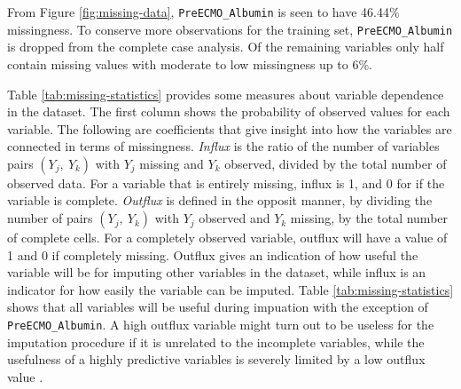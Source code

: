 \documentclass[12pt,]{article}
\begin{document}
From Figure \ref{fig:missing-data}, \texttt{PreECMO\_Albumin} is seen to
have 46.44\% missingness. To conserve more observations for the training
set, \texttt{PreECMO\_Albumin} is dropped from the complete case
analysis. Of the remaining variables only half contain missing values
with moderate to low missingness up to 6\%.

Table \ref{tab:missing-statistics} provides some measures about variable
dependence in the dataset. The first column shows the probability of
observed values for each variable. The following are coefficients that
give insight into how the variables are connected in terms of
missingness. \emph{Influx} is the ratio of the number of variables pairs
\((Y_j, ~Y_k)\) with \(Y_j\) missing and \(Y_k\) observed, divided by
the total number of observed data. For a variable that is entirely
missing, influx is 1, and 0 for if the variable is complete.
\emph{Outflux} is defined in the opposit manner, by dividing the number
of pairs \((Y_j, ~Y_k)\) with \(Y_j\) observed and \(Y_k\) missing, by
the total number of complete cells. For a completely observed variable,
outflux will have a value of 1 and 0 if completely missing. Outflux
gives an indication of how useful the variable will be for imputing
other variables in the dataset, while influx is an indicator for how
easily the variable can be imputed. Table \ref{tab:missing-statistics}
shows that all variables will be useful during impuation with the
exception of \texttt{PreECMO\_Albumin}. A high outflux variable might
turn out to be useless for the imputation procedure if it is unrelated
to the incomplete variables, while the usefulness of a highly predictive
variables is severely limited by a low outflux value
\autocite{van_buuren_flexible_2012}.
\end{document}
